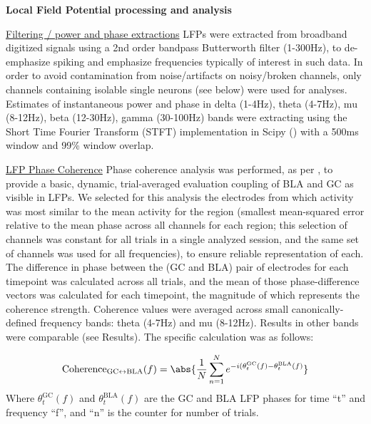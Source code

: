 \begin{refsection}
\smallskip
\noindent\textbf{Local Field Potential processing and analysis}\par

\noindent\underline{Filtering / power and phase extractions}
LFPs were extracted from broadband digitized signals using a 2nd order bandpass Butterworth filter (1-300Hz), to de-emphasize spiking and emphasize frequencies typically of interest in such data. In order to avoid contamination from noise/artifacts on noisy/broken channels, only channels containing isolable single neurons (see below) were used for analyses. Estimates of instantaneous power and phase in delta (1-4Hz), theta (4-7Hz), mu (8-12Hz), beta (12-30Hz), gamma (30-100Hz) bands were extracting using the Short Time Fourier Transform (STFT) implementation in Scipy (\cite{p2020a}) with a 500ms window and 99\% window overlap.

\smallskip
\noindent\underline{LFP Phase Coherence}
Phase coherence analysis was performed, as per \cite{kramer2020a}, to provide a basic, dynamic, trial-averaged evaluation coupling of BLA and GC as visible in LFPs. We selected for this analysis the electrodes from which activity was most similar to the mean activity for the region (smallest mean-squared error relative to the mean phase across all channels for each region; this selection of channels was constant for all trials in a single analyzed session, and the same set of channels was used for all frequencies), to ensure reliable representation of each. The difference in phase between the (GC and BLA) pair of electrodes for each timepoint was calculated across all trials, and the mean of those phase-difference vectors was calculated for each timepoint, the magnitude of which represents the coherence strength.  Coherence values were averaged across small canonically-defined frequency bands: theta (4-7Hz) and mu (8-12Hz). Results in other bands were comparable (see Results). The specific calculation was as follows:

$$\text{Coherence}_{\text{GC}\leftrightarrow\text{BLA}}(f)=\abs{\frac{1}{N}\sum_{n=1}^{N}e^{-i(\theta_t^\text{GC}(f)-\theta_t^\text{BLA}(f)}}$$
\noindent Where $\theta_t^\text{GC}(f)$ and $\theta_t^\text{BLA}(f)$ are the GC and BLA LFP phases for time “t” and frequency “f”, and “n” is the counter for number of trials.


\end{refsection}
